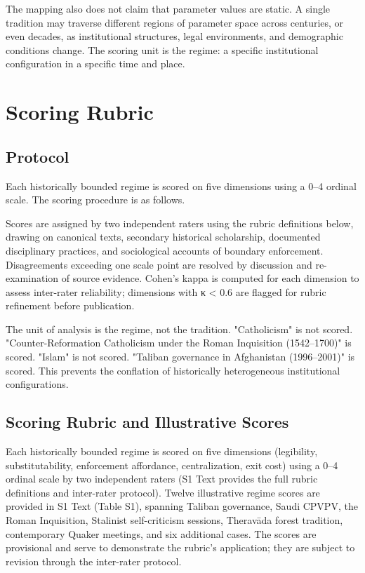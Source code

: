 \documentclass[12pt]{article}
\begin{document}
The mapping also does not claim that parameter values are static. A single tradition may traverse different regions of parameter space across centuries, or even decades, as institutional structures, legal environments, and demographic conditions change. The scoring unit is the regime: a specific institutional configuration in a specific time and place.

%
\section{Scoring Rubric}

%
\subsection{Protocol}

Each historically bounded regime is scored on five dimensions using a 0--4 ordinal scale. The scoring procedure is as follows.

Scores are assigned by two independent raters using the rubric definitions below, drawing on canonical texts, secondary historical scholarship, documented disciplinary practices, and sociological accounts of boundary enforcement. Disagreements exceeding one scale point are resolved by discussion and re-examination of source evidence. Cohen's kappa is computed for each dimension to assess inter-rater reliability; dimensions with κ \textless{} 0.6 are flagged for rubric refinement before publication.

The unit of analysis is the regime, not the tradition. "Catholicism" is not scored. "Counter-Reformation Catholicism under the Roman Inquisition (1542--1700)" is scored. "Islam" is not scored. "Taliban governance in Afghanistan (1996--2001)" is scored. This prevents the conflation of historically heterogeneous institutional configurations.

%
\subsection{Scoring Rubric and Illustrative Scores}

Each historically bounded regime is scored on five dimensions (legibility,
substitutability, enforcement affordance, centralization, exit cost) using
a 0--4 ordinal scale by two independent raters (S1 Text provides
the full rubric definitions and inter-rater protocol). Twelve illustrative
regime scores are provided in S1 Text (Table S1), spanning Taliban
governance, Saudi CPVPV, the Roman Inquisition, Stalinist self-criticism
sessions, Therav\=ada forest tradition, contemporary Quaker meetings, and
six additional cases. The scores are provisional and serve to demonstrate
the rubric's application; they are subject to revision through the
inter-rater protocol.
\end{document}
